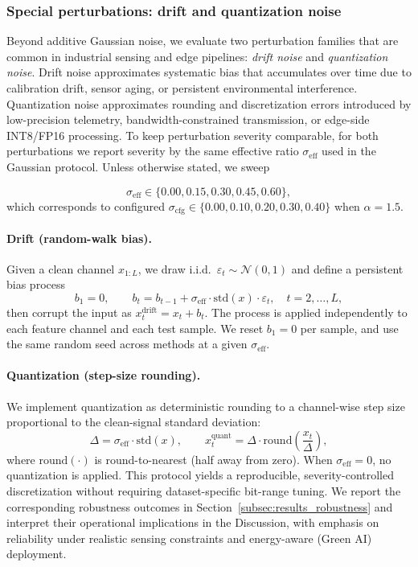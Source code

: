 \documentclass[review,3p,times]{elsarticle}
\begin{document}
\subsubsection{Special perturbations: drift and quantization noise}
Beyond additive Gaussian noise, we evaluate two perturbation families that are common in industrial sensing and edge pipelines: \emph{drift noise} and \emph{quantization noise}. Drift noise approximates systematic bias that accumulates over time due to calibration drift, sensor aging, or persistent environmental interference. Quantization noise approximates rounding and discretization errors introduced by low-precision telemetry, bandwidth-constrained transmission, or edge-side INT8/FP16 processing. To keep perturbation severity comparable, for both perturbations we report severity by the same effective ratio $\sigma_{\mathrm{eff}}$ used in the Gaussian protocol. Unless otherwise stated, we sweep

\begin{equation}
\sigma_{\mathrm{eff}} \in \{0.00, 0.15, 0.30, 0.45, 0.60\},
\end{equation}
which corresponds to configured $\sigma_{\mathrm{cfg}}\in\{0.00,0.10,0.20,0.30,0.40\}$ when $\alpha=1.5$.

\paragraph{Drift (random-walk bias).}
Given a clean channel $x_{1:L}$, we draw i.i.d.\ $\varepsilon_t\sim\mathcal{N}(0,1)$ and define a persistent bias process
\begin{equation}
b_1 = 0,\qquad b_t = b_{t-1} + \sigma_{\mathrm{eff}}\cdot \mathrm{std}(x)\cdot \varepsilon_t,\quad t=2,\dots,L,
\end{equation}
then corrupt the input as $x^{\text{drift}}_t = x_t + b_t$. The process is applied independently to each feature channel and each test sample. We reset $b_1=0$ per sample, and use the same random seed across methods at a given $\sigma_{\mathrm{eff}}$.

\paragraph{Quantization (step-size rounding).}
We implement quantization as deterministic rounding to a channel-wise step size proportional to the clean-signal standard deviation:
\begin{equation}
\Delta = \sigma_{\mathrm{eff}}\cdot \mathrm{std}(x),\qquad
x^{\text{quant}}_t = \Delta\cdot \mathrm{round}\!\left(\frac{x_t}{\Delta}\right),
\end{equation}
where $\mathrm{round}(\cdot)$ is round-to-nearest (half away from zero). When $\sigma_{\mathrm{eff}}=0$, no quantization is applied. This protocol yields a reproducible, severity-controlled discretization without requiring dataset-specific bit-range tuning. We report the corresponding robustness outcomes in Section~\ref{subsec:results_robustness} and interpret their operational implications in the Discussion, with emphasis on reliability under realistic sensing constraints and energy-aware (Green AI) deployment.
\end{document}

